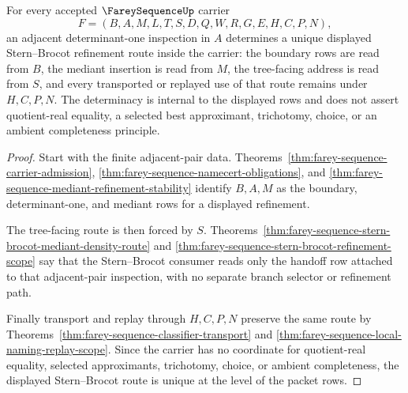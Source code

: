 \begin{theorem}
\label{thm:fareysequence-neighbor-determinacy}
For every accepted $\FareySequenceUp$ carrier
$$
F=(B,A,M,L,T,S,D,Q,W,R,G,E,H,C,P,N),
$$
an adjacent determinant-one inspection in $A$ determines a unique displayed Stern--Brocot refinement route inside the carrier: the boundary rows are read from $B$, the mediant insertion is read from $M$, the tree-facing address is read from $S$, and every transported or replayed use of that route remains under $H,C,P,N$. The determinacy is internal to the displayed rows and does not assert quotient-real equality, a selected best approximant, trichotomy, choice, or an ambient completeness principle.
\end{theorem}
\begin{proof}
Start with the finite adjacent-pair data. Theorems~\ref{thm:farey-sequence-carrier-admission}, \ref{thm:farey-sequence-namecert-obligations}, and \ref{thm:farey-sequence-mediant-refinement-stability} identify $B,A,M$ as the boundary, determinant-one, and mediant rows for a displayed refinement.

The tree-facing route is then forced by $S$. Theorems~\ref{thm:farey-sequence-stern-brocot-mediant-density-route} and \ref{thm:farey-sequence-stern-brocot-refinement-scope} say that the Stern--Brocot consumer reads only the handoff row attached to that adjacent-pair inspection, with no separate branch selector or refinement path.

Finally transport and replay through $H,C,P,N$ preserve the same route by Theorems~\ref{thm:farey-sequence-classifier-transport} and \ref{thm:farey-sequence-local-naming-replay-scope}. Since the carrier has no coordinate for quotient-real equality, selected approximants, trichotomy, choice, or ambient completeness, the displayed Stern--Brocot route is unique at the level of the packet rows.
\end{proof}

